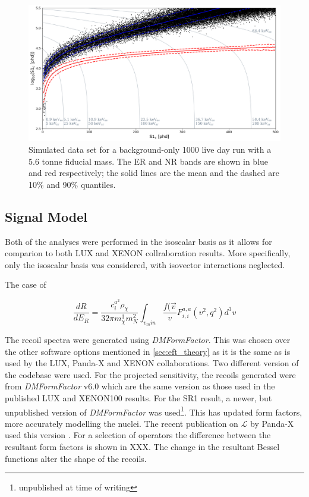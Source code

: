 

\begin{figure}
    \centering
    \includegraphics[width=15cm]{Figures/EFT/Projected_backgrounds/projected_backgrounds_s1_s2.png}
    \caption{Simulated data set for a background-only 1000 live day run with a 5.6 tonne fiducial mass. The ER and NR bands are shown in blue and red respectively; the solid lines are the mean and the dashed are 10\% and 90\% quantiles.}
    \label{fig:my_label}
\end{figure}







\subsection{Signal Model}
\par
\par
Both of the analyses were performed in the isoscalar basis as it allows for comparion to both LUX and XENON collraboration results.
More specifically, only the isoscalar basis was considered, with isovector interactions neglected.
\par
The case of 

\begin{equation}
    \frac{dR}{dE_R} = \frac{c^{a^2}_i \rho_\chi}{32 \pi m^3_\chi m^2_N} \int_{v_min} \frac{f(\vec{v}}{v} F^{a,a}_{i,i} (v^2, q^2) d^3 v
\end{equation}

\par
The recoil spectra were generated using \textit{DMFormFactor}.
This was chosen over the other software options mentioned in \autoref{sec:eft_theory} as it is the same as is used by the LUX, Panda-X and XENON collaborations.
Two different version of the codebase were used.
For the projected sensitivity, the recoils generated were from \textit{DMFormFactor} v6.0 which are the same version as those used in the published LUX and XENON100 results.
For the SR1 result, a newer, but unpublished version of \textit{DMFormFactor} was used\footnote{unpublished at time of writing}.
This has updated form factors, more accurately modelling the nuclei.
The recent publication on $\mathcal{L}$ by Panda-X used this version \cite{pandax_2_eft_ref}.
For a selection of operators the difference between the resultant form factors is shown in XXX.
The change in the resultant Bessel functions alter the shape of the recoils.

